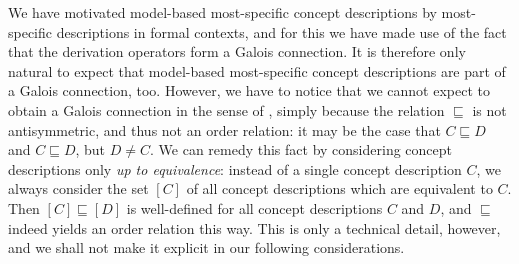 We have motivated model-based most-specific concept descriptions by most-specific
descriptions in formal contexts, and for this we have made use of the fact that the
derivation operators form a Galois connection.  It is therefore only natural to expect
that model-based most-specific concept descriptions are part of a Galois connection, too.
However, we have to notice that we cannot expect to obtain a Galois connection in the
sense of , simply because the relation $\sqsubseteq$ is not
antisymmetric, and thus not an order relation: it may be the case that $C \sqsubseteq D$
and $C \sqsubseteq D$, but $D \neq C$.  We can remedy this fact by considering concept
descriptions only \emph{up to equivalence}: instead of a single concept description $C$,
we always consider the set $[C]$ of all concept descriptions which are equivalent to $C$.
Then $[C] \sqsubseteq [D]$ is well-defined for all concept descriptions $C$ and $D$, and
$\sqsubseteq$ indeed yields an order relation this way.  This is only a technical detail,
however, and we shall not make it explicit in our following considerations.

